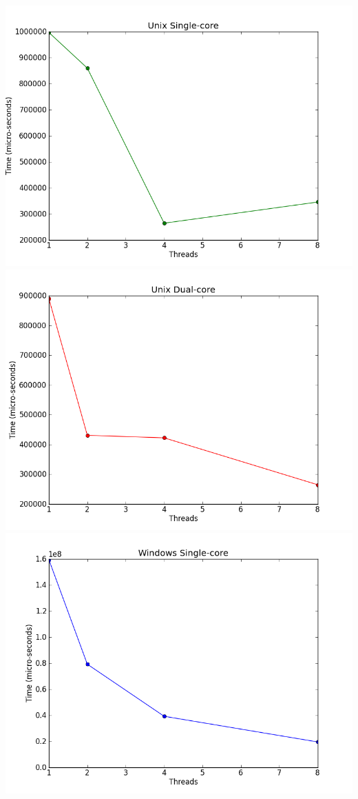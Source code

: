 \documentclass[12pt]{article}
\begin{document}
\includegraphics[scale=0.4]{output/graphs/unix_singlecore.png} 
\includegraphics[scale=0.4]{output/graphs/unix_multicore.png}
\includegraphics[scale=0.4]{output/graphs/win_singlecore.png} 
\end{document}
